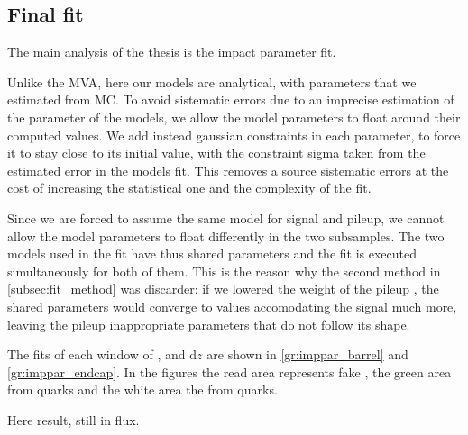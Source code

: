 \subsection{Final fit}
\label{subsec:final_fit}

The main analysis of the thesis is the impact parameter fit. 

Unlike the MVA, here our models are analytical, with parameters that we estimated from MC. 
To avoid sistematic errors due to an imprecise estimation of the parameter of the models, we allow the model parameters to float around their computed values.
We add instead gaussian constraints in each parameter, to force it to stay close to its initial value, with the constraint sigma taken from the estimated error in the models fit.
This removes a source sistematic errors at the cost of increasing the statistical one and the complexity of the fit.

Since we are forced to assume the same model for signal and pileup, we cannot allow the model parameters to float differently in the two subsamples. 
The two models used in the fit have thus shared parameters and the fit is executed simultaneously for both of them.
This is the reason why the second method in \autoref{subsec:fit_method} was discarder: if we lowered the weight of the pileup \Pgm, the shared parameters would converge to values accomodating the signal much more, leaving the pileup inappropriate parameters that do not follow its shape.


The fits of each window of \pt, \psrap and $\mathrm{d}z$ are shown in \autoref{gr:imppar_barrel} and \autoref{gr:imppar_endcap}.
In the figures the read area represents fake \Pgm, the green area \Pgm from \Pqc quarks and the white area the \Pgm from \Pqb quarks.

Here result, still in flux.


